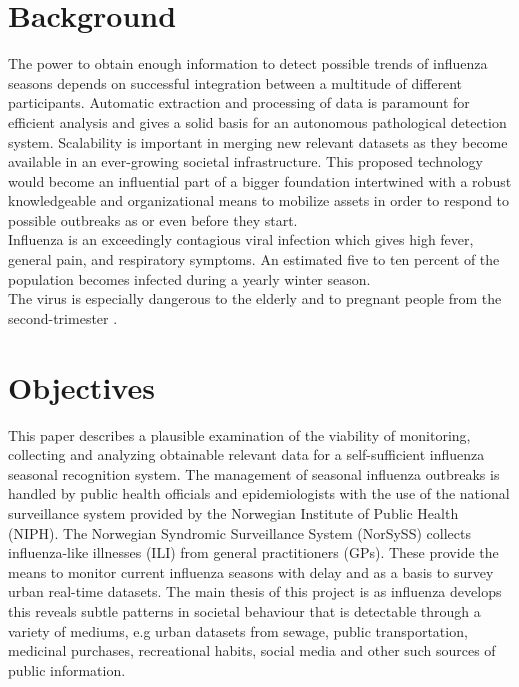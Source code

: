 \section{Background}
The power to obtain enough information to detect possible trends of influenza seasons depends on successful integration between a multitude of different participants. Automatic extraction and processing of data is paramount for efficient analysis and gives a solid basis for an autonomous pathological detection system. Scalability is important in merging new relevant datasets as they become available in an ever-growing societal infrastructure. This proposed technology would become an influential part of a bigger foundation intertwined with a robust knowledgeable and organizational means to mobilize assets in order to respond to possible outbreaks as or even before they start.
\newline \\
Influenza is an exceedingly contagious viral infection which gives high fever, general pain, and respiratory symptoms. An estimated five to ten percent of the population becomes infected during a yearly winter season.\\ The virus is especially dangerous to the elderly and to pregnant people from the second-trimester \cite{fhi_sykdommer}.


\section{Objectives}
This paper describes a plausible examination of the viability of monitoring, collecting and analyzing obtainable relevant data for a self-sufficient influenza seasonal recognition system. The management of seasonal influenza outbreaks is handled by public health officials and epidemiologists with the use of the national surveillance system provided by the Norwegian Institute of Public Health (NIPH)\cite{niph}. The Norwegian Syndromic Surveillance System (NorSySS) collects influenza-like illnesses (ILI) from general practitioners (GPs)\cite{NorSySS}. These provide the means to monitor current influenza seasons with delay and as a basis to survey urban real-time datasets. The main thesis of this project is as influenza develops this reveals subtle patterns in societal behaviour that is detectable through a variety of mediums, e.g urban datasets from sewage, public transportation, medicinal purchases, recreational habits, social media and other such sources of public information.

